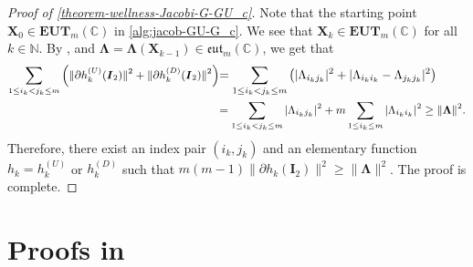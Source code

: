 \documentclass[final,onefignum,onetabnum]{siamart190516}
\newcommand{\matr}[1]{\boldsymbol{#1}}
\newcommand{\CC}{\mathbb{C}}
\newcommand{\NN}{\mathbb{N}}
\newcommand{\EUT}{\mathbf{EUT}}
\newcommand{\eut}{\mathfrak{eut}}
\begin{document}
\begin{proof}[Proof of \cref{theorem-wellness-Jacobi-G-GU_c}]
Note that the starting point  $\matr{X}_{0}\in\EUT_{m}(\CC)$ in \autoref{alg:jacob-GU-G_c}. 
We see that $\matr{X}_{k}\in\EUT_{m}(\CC)$ for all $k\in\NN$. 
By ,  and $\matr{\Lambda}=\matr{\Lambda}(\matr{X}_{k-1})\in\eut_{m}(\CC)$, we get that 
\begin{align*}{\small
\sum_{1\leq i_k<j_k\leq m}  \left(\|\partial h^{(U)}_k(\matr{I}_2)\|^2 + \|\partial h^{(D)}_k(\matr{I}_2) \|^2\right)}
&{\small= \sum_{1\leq i_k<j_k\leq m}  \left(|\Lambda_{i_kj_k}|^2 + |\Lambda_{i_ki_k} - \Lambda_{j_kj_k}|^2\right)}\\
&{\small = \sum_{1\leq i_k<j_k\leq m} |\Lambda_{i_kj_k}|^2 + m\sum_{1\leq i_k\leq m} |\Lambda_{i_ki_k}|^2
\geq \|\matr{\Lambda}\|^2.}
\end{align*}
Therefore, there exist an index pair $(i_k,j_k)$ and an elementary function $h_k = h^{(U)}_k$ or $h^{(D)}_k$ such that 
$m(m-1)\|\partial h_k(\matr{I}_2)\|^2\geq\|\matr{\Lambda}\|^2$. 
The proof is complete. 
\end{proof}
\section{Proofs in }\label{sec:proofs_section_5}
\end{document}
